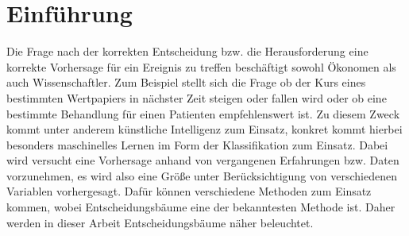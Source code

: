 \chapter{Einführung}
\label{einfuehrung}

Die Frage nach der korrekten Entscheidung bzw. die Herausforderung eine korrekte Vorhersage für ein Ereignis zu treffen beschäftigt sowohl Ökonomen als auch Wissenschaftler. Zum Beispiel stellt sich die Frage ob der Kurs eines bestimmten Wertpapiers in nächster Zeit steigen oder fallen wird oder ob eine bestimmte Behandlung für einen Patienten empfehlenswert ist. \autocite{QuinlanDecisionTrees}
Zu diesem Zweck kommt unter anderem künstliche Intelligenz zum Einsatz, konkret kommt hierbei besonders maschinelles Lernen im Form der Klassifikation zum Einsatz. \autocite{QuinlanID3} Dabei wird versucht eine Vorhersage anhand von vergangenen Erfahrungen bzw. Daten vorzunehmen, es wird also eine Größe unter Berücksichtigung von verschiedenen Variablen vorhergesagt. Dafür können verschiedene Methoden zum Einsatz kommen, wobei Entscheidungsbäume eine der bekanntesten Methode ist. Daher werden in dieser Arbeit Entscheidungsbäume näher beleuchtet.